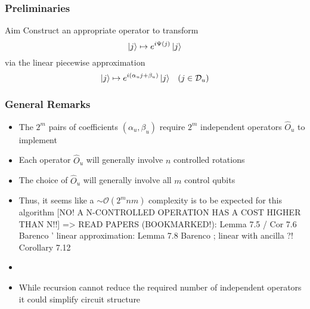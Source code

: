 \documentclass{beamer}
\begin{document}
\begin{frame}
\frametitle{Preliminaries}
\begin{alertblock}{Aim}
Construct an appropriate operator to transform 
\begin{equation}
\ket{j} \mapsto e^{i \Psi (j)} \ket{j}
\end{equation}
via the linear piecewise approximation
\begin{equation}
\ket{j} \mapsto e^{i (\alpha_u j + \beta_u)} \ket{j} \; \; \; (j \in \mathcal{D}_u)
\end{equation}
\end{alertblock}
\end{frame}

\begin{frame}
\frametitle{General Remarks}
\begin{itemize}
\item The $2^m$ pairs of coefficients $(\alpha_u, \beta_u)$ require $2^m$ independent operators $\hat{O}_u$ to implement
\item Each operator $\hat{O}_u$ will generally involve $n$ controlled rotations 
\item The choice of $\hat{O}_u$ will generally involve all $m$ control qubits 
\item Thus, it seems like a \alert{$\sim \mathcal{O}(2^m n m)$ complexity} is to be expected for this algorithm [NO! A N-CONTROLLED OPERATION HAS A COST HIGHER THAN N!!] => READ PAPERS (BOOKMARKED!): Lemma 7.5  / Cor 7.6 Barenco ' linear approximation: Lemma 7.8 Barenco  ; linear with ancilla ?! Corollary 7.12 
\item 
\item While recursion cannot reduce the required number of independent operators it could simplify circuit structure
\end{itemize}
\end{frame}
\end{document}
